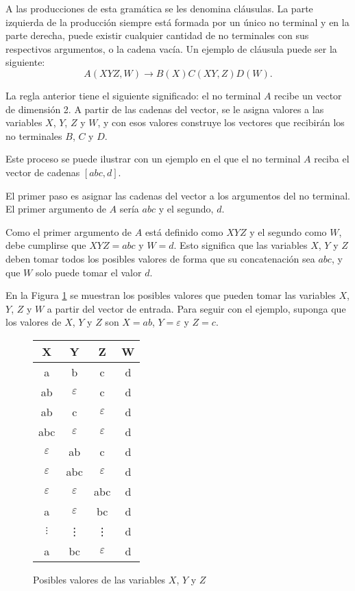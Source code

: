 A las producciones de esta gramática se les denomina cláusulas. La parte izquierda de la producción 
siempre está formada por un único no terminal y en la parte derecha, puede existir cualquier cantidad de no terminales 
con sus respectivos argumentos, o la cadena vacía. Un ejemplo de cláusula puede ser la siguiente:
$$A(XYZ,W)\to B(X)C(XY,Z)D(W).$$

La regla anterior tiene el siguiente significado: el no terminal $A$ recibe un vector de dimensión 2. A partir 
de las cadenas del vector, se le asigna valores a las variables $X$, $Y$, $Z$ y $W$, y con esos valores 
construye los vectores que recibirán los no terminales $B$, $C$ y $D$.

Este proceso se puede ilustrar con un ejemplo en el que el no terminal $A$ reciba el vector de cadenas $[abc, d]$.

El primer paso es asignar las cadenas del vector a los argumentos del no terminal. El primer argumento de $A$ sería $abc$ y el segundo, $d$.

Como el primer argumento de $A$ está definido como $XYZ$ y el segundo como $W$, debe cumplirse que $XYZ=abc$ y $W=d$. Esto significa que las variables $X$, $Y$ y $Z$ deben tomar todos los posibles valores de forma que su concatenación sea $abc$, y que $W$ solo puede tomar el valor $d$.

En la Figura \ref{fig:xyz_eaxmple} se muestran los posibles valores que pueden tomar las variables $X$, $Y$, $Z$ y $W$ a partir del vector de entrada. Para seguir con el ejemplo, suponga que los valores de $X$, $Y$ y $Z$ son $X=ab$, $Y=\varepsilon$ y $Z=c$.


\begin{figure}
    \centering
    \begin{tabular}{|c|c|c|c|}
        \hline
        X             & Y             & Z             & W \\
        \hline
        a             & b             & c             & d \\
        \hline
        ab            & $\varepsilon$ & c             & d \\
        \hline
        ab            & c             & $\varepsilon$ & d \\
        \hline
        abc           & $\varepsilon$ & $\varepsilon$ & d \\
        \hline
        $\varepsilon$ & ab            & c             & d \\
        \hline
        $\varepsilon$ & abc           & $\varepsilon$ & d \\
        \hline
        $\varepsilon$ & $\varepsilon$ & abc           & d \\
        \hline
        a             & $\varepsilon$ & bc            & d \\
        \hline
        $\vdots$      & \vdots        & \vdots        & d \\
        \hline
        a             & bc            & $\varepsilon$ & d \\
        \hline
    \end{tabular}
    \caption{Posibles valores de las variables $X$, $Y$ y $Z$}
    \label{fig:xyz_eaxmple}
\end{figure}

